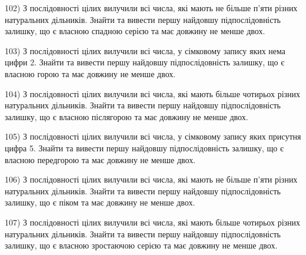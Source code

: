 \documentclass[11pt, ukrainian]{article}
\begin{document}
\par
\vspace{0.9cm}
102) \space 
З послідовності цілих вилучили всі числа, які мають не більше п'яти різних натуральних дільників. Знайти та вивести першу найдовшу підпослідовність залишку, що є власною спадною серією та має довжину не менше двох.

\par
\vspace{0.9cm}
103) \space 
З послідовності цілих вилучили всі числа, у сімковому запису яких нема цифри 2. Знайти та вивести першу найдовшу підпослідовність залишку, що є власною горою та має довжину не менше двох.

\par
\vspace{0.9cm}
104) \space 
З послідовності цілих вилучили всі числа, які мають більше чотирьох різних натуральних дільників. Знайти та вивести першу найдовшу підпослідовність залишку, що є власною післягорою та має довжину не менше двох.

\par
\vspace{0.9cm}
105) \space 
З послідовності цілих вилучили всі числа, у сімковому запису яких присутня цифра 5. Знайти та вивести першу найдовшу підпослідовність залишку, що є власною передгорою та має довжину не менше двох.

\par
\vspace{0.9cm}
106) \space 
З послідовності цілих вилучили всі числа, які мають не більше п'яти різних натуральних дільників. Знайти та вивести першу найдовшу підпослідовність залишку, що є піком та має довжину не менше двох.

\par
\vspace{0.9cm}
107) \space 
З послідовності цілих вилучили всі числа, які мають більше чотирьох різних натуральних дільників. Знайти та вивести першу найдовшу підпослідовність залишку, що є власною зростаючою серією та має довжину не менше двох.
\end{document}
